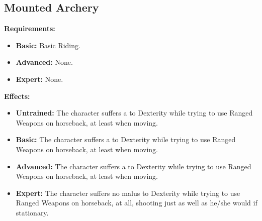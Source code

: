 \subsection{Mounted Archery}
\begin{table}[!ht]
\centering
{}
\end{table}
\textbf{Requirements:}
\begin{itemize}
	\item \textbf{Basic:} Basic Riding.
	\item \textbf{Advanced:} None.
	\item \textbf{Expert:} None.
\end{itemize}
\textbf{Effects:}
\begin{itemize}
	\item \textbf{Untrained:} The character suffers a  to Dexterity while trying to use Ranged Weapons on horseback, at least when moving.
	\item \textbf{Basic:} The character suffers a  to Dexterity while trying to use Ranged Weapons on horseback, at least when moving.
	\item \textbf{Advanced:} The character suffers a  to Dexterity while trying to use Ranged Weapons on horseback, at least when moving.
	\item \textbf{Expert:} The character suffers no malus to Dexterity while trying to use Ranged Weapons on horseback, at all, shooting just as well as he/she would if stationary.
\end{itemize}\newpage
